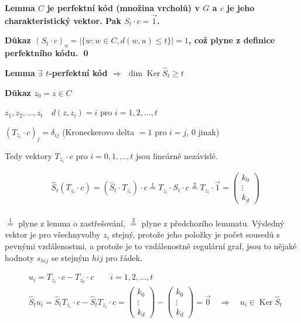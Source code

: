 \documentclass[a4paper,12pt,titlepage]{article}
\newcommand{\lm}{\smallskip\noindent\bf Lemma\rm{} }
\newcommand{\dk}{\smallskip\noindent\bf Důkaz\rm{} }
\DeclareMathOperator{\Ker}{Ker}
\begin{document}
\lm $C$ je perfektní kód (množina vrcholů) v $G$ a $c$ je jeho charakteristický vektor. Pak $S_t\cdot c = \vec 1$.

\dk $(S_t\cdot c)_u = |\{w: w\in C, d(w,u) \le t\}| = 1$, což plyne z definice perfektního kódu.
\qed

\lm $\exists$ $t$-perfektní kód $\Rightarrow$ $\dim \Ker \widehat S_t \ge t$

\dk $z_0 = z \in C$

$z_1,z_2,\dots,z_t \quad d(z,z_i) = i$ pro $i = 1,2,\dots,t$

$(T_{z_i} \cdot c)_j = \delta_{ij}$ (Kroneckerovo delta $= 1$ pro $i=j$, $0$ jinak)

Tedy vektory $T_{z_i} \cdot c$ pro $i = 0, 1, \dots, t$ jsou lineárně nezávislé.

\begin{align*}
	&\widehat S_t(T_{z_i}\cdot c) = (\widehat S_t \cdot T_{z_i}) \cdot c \overset{1}{=} T_{z_i} \cdot S_t \cdot c \overset{2}{=} T_{z_i}\cdot \vec 1 = \left(\begin{matrix}
		k_0 \\ \vdots \\ k_d
	\end{matrix}\right) \\
\end{align*}

$\overset{1}{=}$ plyne z lemma o zastřešování, $\overset{2}{=}$ plyne z předchozího lemmatu. Výsledný vektor je pro všechnyvolby $z_i$ stejný, protože jeho položky je počet sousedů s pevnými vzdálenostmi, a protože je to vzdálenostně regulární graf, jsou to nějaké hodnoty $s_{hij}$ se stejným $hij$ pro řádek.

\begin{align*}
	&u_i = T_{z_i}\cdot c - T_{z_0}\cdot c\qquad i = 1, 2, \dots, t \\
	&\widehat S_t u_i = \widehat S_t T_{z_i}\cdot c - \widehat S_t T_{z_i}\cdot c = \left(\begin{matrix}k_0 \\ \vdots \\ k_d\end{matrix}\right) - \left(\begin{matrix}k_0 \\ \vdots \\ k_d\end{matrix}\right) = \vec 0 \quad\Rightarrow\quad u_i\in\Ker \widehat S_t\\
\end{align*}
\end{document}
